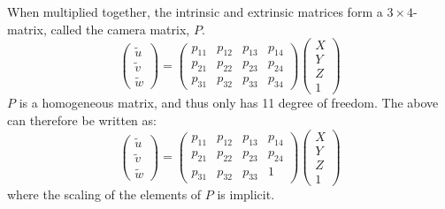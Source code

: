 When multiplied together, the intrinsic and extrinsic matrices form a $3\times4$-matrix, called the camera matrix, $P$.
\begin{equation} \label{eq:projection2}
\begin{pmatrix} \tilde{u} \\ \tilde{v} \\ \tilde{w} \end{pmatrix} =
\begin{pmatrix} p_{11} & p_{12} & p_{13} & p_{14} \\
 				p_{21} & p_{22} & p_{23} & p_{24} \\
				p_{31} & p_{32} & p_{33} & p_{34} \end{pmatrix}
\begin{pmatrix}X \\Y \\Z \\1\end{pmatrix}
\end{equation}
$P$ is a homogeneous matrix, and thus only has 11 degree of freedom.
The above can therefore be written as:
\begin{equation}\label{eq:projection3}
\begin{pmatrix} \tilde{u} \\ \tilde{v} \\ \tilde{w} \end{pmatrix} =
\begin{pmatrix} p_{11} & p_{12} & p_{13} & p_{14} \\
 				p_{21} & p_{22} & p_{23} & p_{24} \\
				p_{31} & p_{32} & p_{33} & 1 \end{pmatrix}
\begin{pmatrix}X \\Y \\Z \\1\end{pmatrix}
\end{equation}
where the scaling of the elements of $P$ is implicit. \cite[153-165]{hartley-zisserman}

